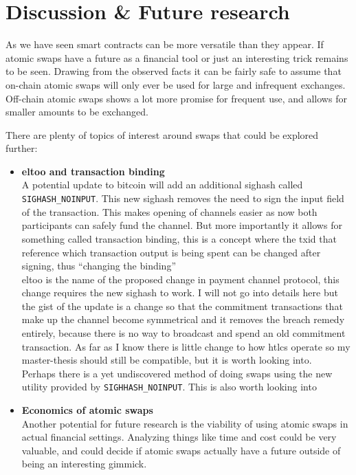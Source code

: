 \chapter{Discussion \& Future research}
As we have seen smart contracts can be more versatile than they appear. If atomic swaps have a future as a financial tool or just an interesting trick remains to be seen. Drawing from the observed facts it can be fairly safe to assume that on-chain atomic swaps will only ever be used for large and infrequent exchanges. Off-chain atomic swaps shows a lot more promise for frequent use, and allows for smaller amounts to be exchanged. 

There are plenty of topics of interest around swaps that could be explored further:
\begin{itemize}
	\item \textbf{eltoo and transaction binding}\\A potential update to bitcoin will add an additional sighash called \texttt{SIGHASH\_NOINPUT}. This new sighash removes the need to sign the input field of the transaction. This makes opening of channels easier as now both participants can safely fund the channel. But more importantly it allows for something called transaction binding, this is a concept where the txid that reference which transaction output is being spent can be changed after signing, thus \enquote{changing the binding}\\
	
	eltoo is the name of the proposed change in payment channel protocol, this change requires the new sighash to work. I will not go into details here but the gist of the update is a change so that the commitment transactions that make up the channel become symmetrical and it removes the breach remedy entirely, because there is no way to broadcast and spend an old commitment transaction. As far as I know there is little change to how htlcs operate so my master-thesis should still be compatible, but it is worth looking into.\\
	
	Perhaps there is a yet undiscovered method of doing swaps using the new utility provided by \texttt{SIGHHASH\_NOINPUT}. This is also worth looking into\\
	
	\item \textbf{Economics of atomic swaps}\\Another potential for future research is the viability of using atomic swaps in actual financial settings. Analyzing things like time and cost could be very valuable, and could decide if atomic swaps actually have a future outside of being an interesting gimmick.\\
	

\end{itemize}
